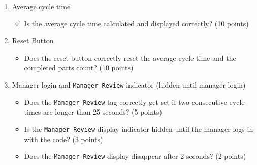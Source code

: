 \begin{samepage}
\begin{enumerate}
    \item Average cycle time
    \begin{itemize}
        \item Is the average cycle time calculated and displayed correctly? (10 points)
    \end{itemize}
    
    \item Reset Button
    \begin{itemize}
        \item Does the reset button correctly reset the average cycle time and the completed parts count? (10 points)
    \end{itemize}
    
    \item Manager login and \verb|Manager_Review| indicator (hidden until manager login)
    \begin{itemize}
        \item Does the \verb|Manager_Review| tag correctly get set if two consecutive cycle times are longer than 25 seconds? (5 points)
        \item Is the \verb|Manager_Review| display indicator hidden until the manager logs in with the code? (3 points)
        \item Does the \verb|Manager_Review| display disappear after 2 seconds? (2 points)
    \end{itemize}
    
\end{enumerate}
\end{samepage}